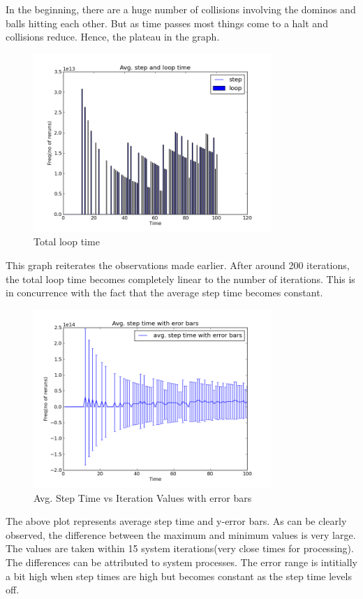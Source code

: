 \documentclass[11pt]{article}
\begin{document}
In the beginning, there are a huge number of collisions involving the dominos and balls hitting each other. But as time passes most things come to a halt and collisions reduce. Hence, the plateau in the graph.

\begin{figure}[ht!]
\centering
\includegraphics[width=90mm]{g32_lab09_plot01.png}
\caption{Total loop time}
\label{overflow}
\end{figure}

This graph reiterates the observations made earlier. After around 200 iterations, the total loop time becomes completely linear to the number of iterations. This is in concurrence with the fact that the average step time becomes constant.

\begin{figure}[ht!]
\centering
\includegraphics[width=90mm]{g32_lab09_plot03.png}
\caption{Avg. Step Time vs Iteration Values with error bars}
\label{overflow}
\end{figure}

The above plot represents average step time and y-error bars. As can be clearly observed, the difference between the maximum and minimum values is very large. The values are taken within 15 system iterations(very close times for processing). The differences can be attributed to system processes. The error range is intitially a bit high when step times are high but becomes constant as the step time levels off.
\end{document}

